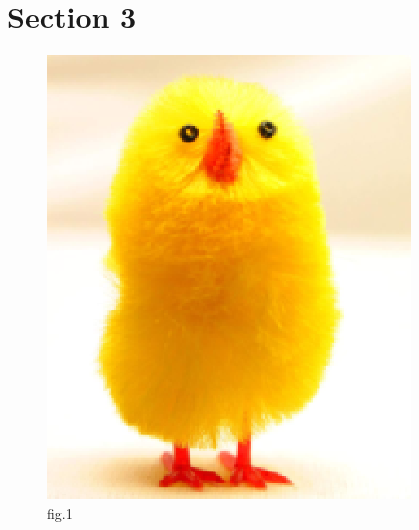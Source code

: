 \documentclass[14pt]{article}
\begin{document}
\section{Section 3}
\begin{figure}[ht!]
\centering
\includegraphics[scale=0.5, angle=180]{chick}
\caption{fig.1}
\end{figure}
\end{document}
